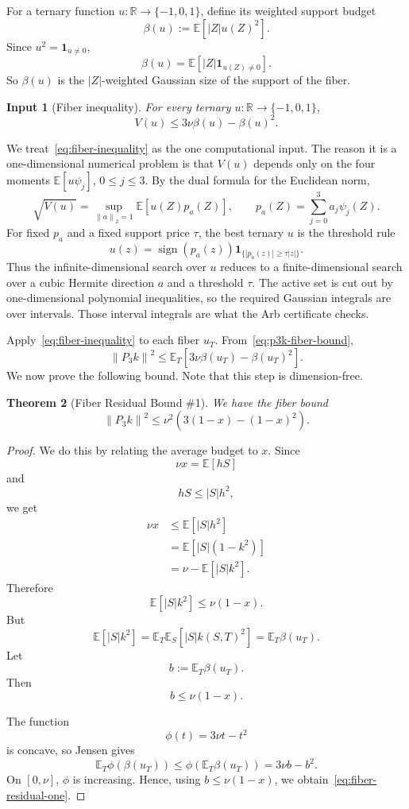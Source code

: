 \documentclass[11pt]{article}
\newtheorem{theorem}{Theorem}[section]
\newtheorem{assumption}[theorem]{Input}
\numberwithin{equation}{section}
\newcommand{\R}{\mathbb R}
\newcommand{\E}{\mathbb E}
\newcommand{\norm}[1]{\left\|#1\right\|}
\newcommand{\one}{\mathbf 1}
\newcommand{\sgn}{\operatorname{sign}}
\begin{document}
For a ternary function $u:\R\to\{-1,0,1\}$, define its weighted support budget
\[
        \beta(u):=\E[|Z|u(Z)^2].
\]
Since $u^2=\one_{u\neq0}$,
\[
        \beta(u)=\E[|Z|\one_{u(Z)\neq0}].
\]
So $\beta(u)$ is the $|Z|$-weighted Gaussian size of the support of the fiber.

\begin{assumption}[Fiber inequality]
For every ternary $u:\R\to\{-1,0,1\}$,
\begin{equation}
        V(u)\le 3\nu\beta(u)-\beta(u)^2.
        \label{eq:fiber-inequality}
\end{equation}
\end{assumption}

We treat~\eqref{eq:fiber-inequality} as the one computational input. The reason it is a one-dimensional numerical problem is that $V(u)$ depends only on the four moments $\E[u\psi_j]$, $0\le j\le3$. By the dual formula for the Euclidean norm,
\[
        \sqrt{V(u)}=\sup_{\norm{a}_2=1}\E[u(Z)p_a(Z)],
        \qquad
        p_a(Z)=\sum_{j=0}^3a_j\psi_j(Z).
\]
For fixed $p_a$ and a fixed support price $\tau$, the best ternary $u$ is the threshold rule
\[
        u(z)=\sgn(p_a(z))\one_{\{|p_a(z)|\ge \tau |z|\}}.
\]
Thus the infinite-dimensional search over $u$ reduces to a finite-dimensional search over a cubic Hermite direction $a$ and a threshold $\tau$. The active set is cut out by one-dimensional polynomial inequalities, so the required Gaussian integrals are over intervals. Those interval integrals are what the Arb certificate checks.

Apply~\eqref{eq:fiber-inequality} to each fiber $u_T$. From~\eqref{eq:p3k-fiber-bound},
\[
        \norm{P_3k}^2
        \le
        \E_T\left[3\nu\beta(u_T)-\beta(u_T)^2\right].
\]
We now prove the following bound. Note that this step is dimension-free.

\begin{theorem}[Fiber Residual Bound \#1]
We have the fiber bound
\begin{equation}
        \norm{P_3k}^2
        \le
        \nu^2\left(3(1-x)-(1-x)^2\right).
        \label{eq:fiber-residual-one}
\end{equation}
\end{theorem}

\begin{proof}
We do this by relating the average budget to $x$. Since
\[
        \nu x=\E[hS]
\]
and
\[
        hS\le |S|h^2,
\]
we get
\begin{align*}
        \nu x
        &\le \E[|S|h^2]\\
        &=\E[|S|(1-k^2)]\\
        &=\nu-\E[|S|k^2].
\end{align*}
Therefore
\[
        \E[|S|k^2]\le \nu(1-x).
\]
But
\[
        \E[|S|k^2]
        =\E_T\E_S[|S|k(S,T)^2]
        =\E_T\beta(u_T).
\]
Let
\[
        b:=\E_T\beta(u_T).
\]
Then
\[
        b\le \nu(1-x).
\]

The function
\[
        \phi(t)=3\nu t-t^2
\]
is concave, so Jensen gives
\[
        \E_T\phi(\beta(u_T))\le \phi(\E_T\beta(u_T))=3\nu b-b^2.
\]
On $[0,\nu]$, $\phi$ is increasing. Hence, using $b\le \nu(1-x)$, we obtain~\eqref{eq:fiber-residual-one}.
\end{proof}
\end{document}
